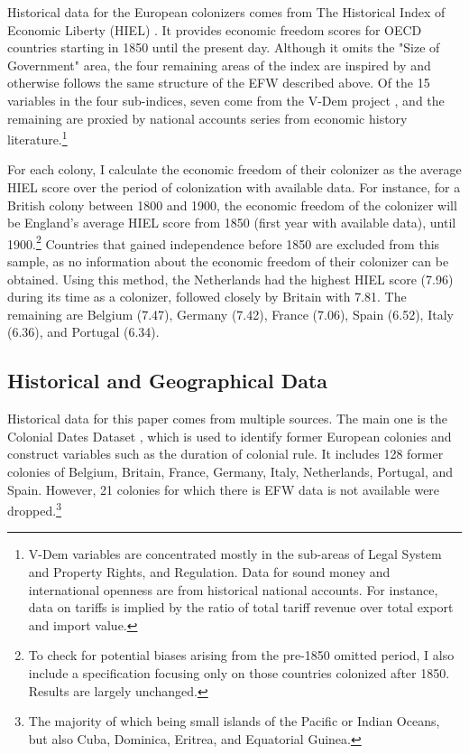 \documentclass[a4paper,12pt]{article}
\begin{document}
Historical data for the European colonizers comes from The Historical Index of Economic Liberty (HIEL) \citep{prados2016economic}. It provides economic freedom scores for OECD countries starting in 1850 until the present day. Although it omits the "Size of Government" area, the four remaining areas of the index are inspired by and otherwise follows the same structure of the EFW described above. Of the 15 variables in the four sub-indices, seven come from the V-Dem project \citep{coppedge2019methodology}, and the remaining are proxied by national accounts series from economic history literature.\footnote{V-Dem variables are concentrated mostly in the sub-areas of Legal System and Property Rights, and Regulation. Data for sound money and international openness are from historical national accounts. For instance, data on tariffs is implied by the ratio of total tariff revenue over total export and import value.} 

For each colony, I calculate the economic freedom of their colonizer as the average HIEL score over the period of colonization with available data. For instance, for a British colony between 1800 and 1900, the economic freedom of the colonizer will be England's average HIEL score from 1850 (first year with available data), until 1900.\footnote{To check for potential biases arising from the pre-1850 omitted period, I also include a specification focusing only on those countries colonized after 1850. Results are largely unchanged.} Countries that gained independence before 1850 are excluded from this sample, as no information about the economic freedom of their colonizer can be obtained. Using this method, the Netherlands had the highest HIEL score (7.96) during its time as a colonizer, followed closely by Britain with 7.81. The remaining are Belgium (7.47), Germany (7.42), France (7.06), Spain (6.52), Italy (6.36), and Portugal (6.34).

\subsection{Historical and Geographical Data}
\label{sec:HistoricalData}

Historical data for this paper comes from multiple sources. The main one is the Colonial Dates Dataset \citep{COLDAT}, which is used to identify former European colonies and construct variables such as the duration of colonial rule. It includes 128 former colonies of Belgium, Britain, France, Germany, Italy, Netherlands, Portugal, and Spain. However, 21 colonies for which there is EFW data is not available were dropped.\footnote{The majority of which being small islands of the Pacific or Indian Oceans, but also Cuba, Dominica, Eritrea, and Equatorial Guinea.}
\end{document}
